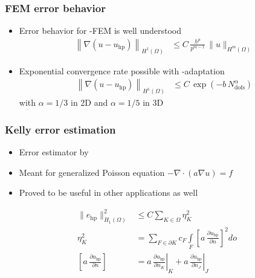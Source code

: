 \begin{frame}
\frametitle{FEM error behavior}

\begin{itemize}
\item Error behavior for \hp-FEM is well understood \parencite{babuska1990}
  \begin{align*}
  \left\|\nabla\left(u \!-\! u_\text{hp}\right)\right\|_{H^{1}(\Omega)} &\leq C \, \frac{h^p}{p^{m-1}} \, \|u\|_{H^{m}(\Omega)}
  \end{align*}
\end{itemize}

\begin{itemize}
\item Exponential convergence rate possible with \hp-adaptation \parencite{babuska1996}
  \begin{align*}
  \left\|\nabla\left(u \!-\! u_\text{hp}\right)\right\|_{H^{1}(\Omega)} &\leq C \, \exp\left(- b \, N_\text{dofs}^\alpha\right)
  \end{align*}
  with $\alpha = 1/3$ in 2D and $\alpha = 1/5$ in 3D
\end{itemize}
\end{frame}





\begin{frame}
\frametitle{Kelly error estimation}

\begin{itemize}
\item Error estimator by \parencite{kelly1983}
\item Meant for generalized Poisson equation $-\nabla \cdot (a \nabla u) = f$
\item Proved to be useful in other applications as well
\end{itemize}

\begin{align*}
\|e_\text{hp}\|_{H_1(\Omega)}^2 &\leq C \sum\limits_{K \in \Omega} \eta_K^2 \\
\eta_K^2 &= \sum\limits_{F \in \partial K} c_F \int\limits_{F} \left[ a \, \frac{\partial u_\text{hp}}{\partial n} \right]^2 do \\
\left[ a \, \frac{\partial u_\text{hp}}{\partial n} \right] &= \left. a \, \frac{\partial u_\text{hp}}{\partial n_K} \right|_K + \left. a \, \frac{\partial u_\text{hp}}{\partial n_J}\right|_J
\end{align*}
\end{frame}





